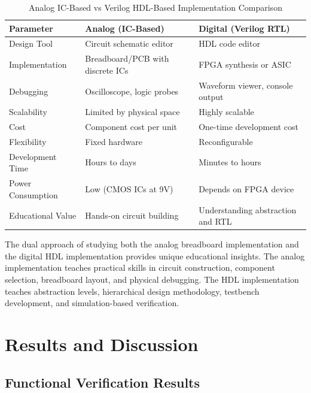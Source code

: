 \documentclass[12pt,a4paper]{report}
\begin{document}
\begin{table}[H]
    \centering
    \caption{Analog IC-Based vs Verilog HDL-Based Implementation Comparison}
    \label{tab:comparison}
    \begin{tabular}{|l|p{5cm}|p{5cm}|}
        \hline
        \textbf{Parameter} & \textbf{Analog (IC-Based)} & \textbf{Digital (Verilog RTL)} \\
        \hline
        Design Tool & Circuit schematic editor & HDL code editor \\
        \hline
        Implementation & Breadboard/PCB with discrete ICs & FPGA synthesis or ASIC \\
        \hline
        Debugging & Oscilloscope, logic probes & Waveform viewer, console output \\
        \hline
        Scalability & Limited by physical space & Highly scalable \\
        \hline
        Cost & Component cost per unit & One-time development cost \\
        \hline
        Flexibility & Fixed hardware & Reconfigurable \\
        \hline
        Development Time & Hours to days & Minutes to hours \\
        \hline
        Power Consumption & Low (CMOS ICs at 9V) & Depends on FPGA device \\
        \hline
        Educational Value & Hands-on circuit building & Understanding abstraction and RTL \\
        \hline
    \end{tabular}
\end{table}

The dual approach of studying both the analog breadboard implementation and the digital HDL implementation provides unique educational insights. The analog implementation teaches practical skills in circuit construction, component selection, breadboard layout, and physical debugging. The HDL implementation teaches abstraction levels, hierarchical design methodology, testbench development, and simulation-based verification.

\chapter{Results and Discussion}

\section{Functional Verification Results}
\end{document}
